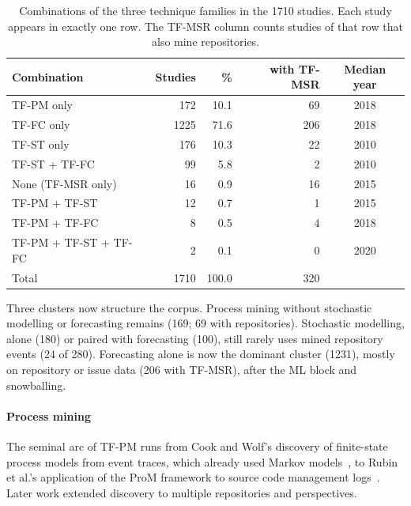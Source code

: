 \documentclass[preprint,12pt,authoryear=false]{elsarticle}
\newcommand{\PM}{TF-PM}
\newcommand{\ST}{TF-ST}
\newcommand{\FC}{TF-FC}
\newcommand{\MSR}{TF-MSR}
\begin{document}
\begin{table}[t]
\centering\small
\caption{Combinations of the three technique families in the 1710 studies. Each study appears in exactly one row. The \MSR{} column counts studies of that row that also mine repositories.}\label{tab:combos}
\begin{tabular}{lrrrc}
\toprule
Combination & Studies & \% & with \MSR{} & Median year \\
\midrule
\PM{} only & 172 & 10.1 & 69 & 2018 \\
\FC{} only & 1225 & 71.6 & 206 & 2018 \\
\ST{} only & 176 & 10.3 & 22 & 2010 \\
\ST{} + \FC{} & 99 & 5.8 & 2 & 2010 \\
None (\MSR{} only) & 16 & 0.9 & 16 & 2015 \\
\PM{} + \ST{} & 12 & 0.7 & 1 & 2015 \\
\PM{} + \FC{} & 8 & 0.5 & 4 & 2018 \\
\PM{} + \ST{} + \FC{} & 2 & 0.1 & 0 & 2020 \\
\midrule
Total & 1710 & 100.0 & 320 & \\
\bottomrule
\end{tabular}
\end{table}

Three clusters now structure the corpus. Process mining without stochastic modelling or forecasting remains (169; 69 with repositories). Stochastic modelling, alone (180) or paired with forecasting (100), still rarely uses mined repository events (24 of 280). Forecasting alone is now the dominant cluster (1231), mostly on repository or issue data (206 with \MSR{}), after the ML block and snowballing.

\paragraph{Process mining}
The seminal arc of \PM{} runs from Cook and Wolf's discovery of finite-state process models from event traces, which already used Markov models~\cite{cook1995,cook1998}, to Rubin et al.'s application of the ProM framework to source code management logs~\cite{rubin2007}. Later work extended discovery to multiple repositories and perspectives.
\end{document}
